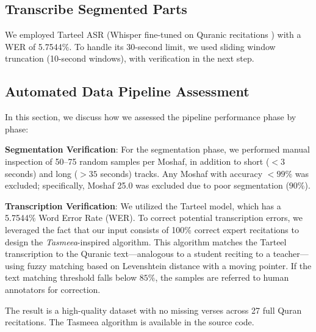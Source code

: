\subsection{Transcribe Segmented Parts}
We employed Tarteel ASR \cite{tarteel_whisper_ar_quran} (Whisper fine-tuned on Quranic recitations \cite{radford2023robust}) with a WER of 5.7544\%. To handle its 30-second limit, we used sliding window truncation (10-second windows), with verification in the next step.

\subsection{Automated Data Pipeline Assessment}
In this section, we discuss how we assessed the pipeline performance phase by phase:

\textbf{Segmentation Verification}: For the segmentation phase, we performed manual inspection of 50--75 random samples per Moshaf, in addition to short ($< 3$ seconds) and long ($> 35$ seconds) tracks. Any Moshaf with accuracy $< 99\%$ was excluded; specifically, Moshaf 25.0 was excluded due to poor segmentation ($90\%$).

\textbf{Transcription Verification}: We utilized the Tarteel model, which has a 5.7544\% Word Error Rate (WER). To correct potential transcription errors, we leveraged the fact that our input consists of 100\% correct expert recitations to design the \textit{Tasmeea}-inspired algorithm. This algorithm matches the Tarteel transcription to the Quranic text—analogous to a student reciting to a teacher—using fuzzy matching based on Levenshtein distance \cite{levenshtein1966binary} with a moving pointer. If the text matching threshold falls below $85\%$, the samples are referred to human annotators for correction.

The result is a high-quality dataset with no missing verses across 27 full Quran recitations. The Tasmeea algorithm is available in the source code.

